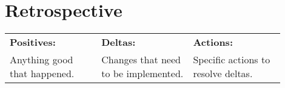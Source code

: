 \documentclass[compsoc,draftclsnofoot,onecolumn,10pt]{IEEEtran}
\begin{document}
%        
%        
   
\section{Retrospective}

    
	\begin{center}
		\begin{tabular}{|p{0.3\linewidth}|p{0.3\linewidth}|p{0.3\linewidth}|}
			\hline
			\textbf{Positives:} & \textbf{Deltas:} & \textbf{Actions:}\\
			
            		Anything good that happened. & Changes that need to be implemented. & Specific actions to resolve deltas.\\
			\hline
			
		\end{tabular}
	\end{center}
\end{document}
